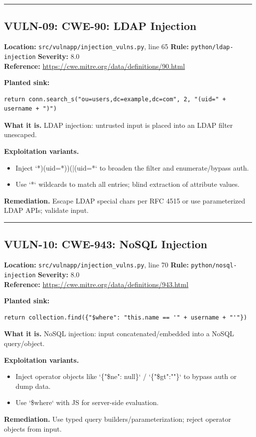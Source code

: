 \documentclass[11pt,a4paper]{article}
\begin{document}
\vspace{4pt}\hrule\vspace{6pt}
\subsection{VULN-09: CWE-90: LDAP Injection}
\noindent\textbf{Location:} \texttt{src/vulnapp/injection\_vulns.py}, line 65 \quad \textbf{Rule:} \texttt{python/ldap-injection} \quad \textbf{Severity:} 8.0
\\ \textbf{Reference:} \url{https://cwe.mitre.org/data/definitions/90.html}

\noindent\textbf{Planted sink:}
\begin{lstlisting}
return conn.search_s("ou=users,dc=example,dc=com", 2, "(uid=" + username + ")")
\end{lstlisting}
\noindent\textbf{What it is.} LDAP injection: untrusted input is placed into an LDAP filter unescaped.

\noindent\textbf{Exploitation variants.}
\begin{itemize}[leftmargin=1.4em,itemsep=1pt,topsep=2pt]
\item Inject `*)(uid=*))(|(uid=*` to broaden the filter and enumerate/bypass auth.
\item Use `*` wildcards to match all entries; blind extraction of attribute values.
\end{itemize}
\noindent\textbf{Remediation.} Escape LDAP special chars per RFC 4515 or use parameterized LDAP APIs; validate input.

\vspace{4pt}\hrule\vspace{6pt}
\subsection{VULN-10: CWE-943: NoSQL Injection}
\noindent\textbf{Location:} \texttt{src/vulnapp/injection\_vulns.py}, line 70 \quad \textbf{Rule:} \texttt{python/nosql-injection} \quad \textbf{Severity:} 8.0
\\ \textbf{Reference:} \url{https://cwe.mitre.org/data/definitions/943.html}

\noindent\textbf{Planted sink:}
\begin{lstlisting}
return collection.find({"$where": "this.name == '" + username + "'"})
\end{lstlisting}
\noindent\textbf{What it is.} NoSQL injection: input concatenated/embedded into a NoSQL query/object.

\noindent\textbf{Exploitation variants.}
\begin{itemize}[leftmargin=1.4em,itemsep=1pt,topsep=2pt]
\item Inject operator objects like `\{"\$ne": null\}` / `\{"\$gt":""\}` to bypass auth or dump data.
\item Use `\$where` with JS for server-side evaluation.
\end{itemize}
\noindent\textbf{Remediation.} Use typed query builders/parameterization; reject operator objects from input.
\end{document}
